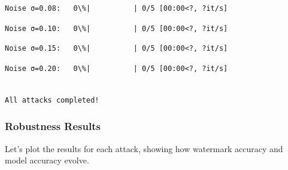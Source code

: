\documentclass[11pt]{article}
\begin{document}
    
    
    \begin{Verbatim}[commandchars=\\\{\}]
Noise σ=0.08:   0\%|          | 0/5 [00:00<?, ?it/s]
    \end{Verbatim}

    
    
    \begin{Verbatim}[commandchars=\\\{\}]
Noise σ=0.10:   0\%|          | 0/5 [00:00<?, ?it/s]
    \end{Verbatim}

    
    
    \begin{Verbatim}[commandchars=\\\{\}]
Noise σ=0.15:   0\%|          | 0/5 [00:00<?, ?it/s]
    \end{Verbatim}

    
    
    \begin{Verbatim}[commandchars=\\\{\}]
Noise σ=0.20:   0\%|          | 0/5 [00:00<?, ?it/s]
    \end{Verbatim}

    
    \begin{Verbatim}[commandchars=\\\{\}]

All attacks completed!
    \end{Verbatim}

    \subsubsection{Robustness Results}\label{robustness-results}

Let's plot the results for each attack, showing how watermark accuracy
and model accuracy evolve.
\end{document}
